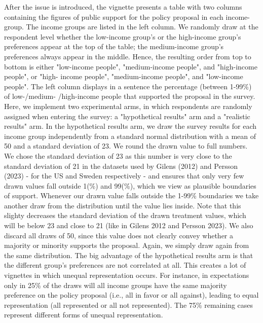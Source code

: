 \documentclass[12pt, letterpaper]{article}
\begin{document}
\begin{spacing}{1.5}
After the issue is introduced, the vignette presents a table with two columns containing the figures of public support for the policy 
proposal in each income- group. The income groups are listed in the left column. We randomly draw at the respondent level whether the low-income group's or the high-income group's preferences appear at the top of the table; the medium-income group's preferences always appear in the middle. Hence, the resulting order from top to bottom is either "low-income people", "medium-income people", and "high-income people", or "high- income people", "medium-income people", and "low-income people". The left column displays in a sentence the percentage (between 1-99\%) of low-/medium- /high-income people that supported the proposal in the survey.
Here, we implement two experimental arms, in which respondents are randomly assigned when entering the survey: a "hypothetical results" arm and a "realistic results" arm. In the hypothetical results arm, we draw the survey results for each income group independently from a standard normal distribution with a mean of 50 and a standard deviation of 23. We round the drawn value to full numbers. We chose the standard deviation of 23 as this number is very close to the standard deviation of 21 in the datasets used by Gilens (2012) and Persson (2023) - for the US and Sweden respectively - and ensures that only very few drawn values fall outside 1(\%) and 99(\%), which we view as plausible boundaries of support. Whenever our drawn value falls outside the 1-99\% boundaries we take another draw from the distribution until the value lies inside. Note that this slighty decreases the standard deviation of the drawn treatment values, which will be below 23 and close to 21 (like in Gilens 2012 and Persson 2023). We also discard all draws of 50, since this value does not clearly convey whether a majority or minority supports the proposal. Again, we simply draw again from the same distribution. The big advantage of the hypothetical results arm is that the different group's preferences are not correlated at all. This creates a lot of vignettes in which unequal representation occurs. For instance, in expectations only in 25\% of the draws will all income groups have the same majority preference on the policy proposal (i.e., all in favor or all against), leading to equal representation (all represented or all not represented). The 75\% remaining cases represent different forms of unequal representation.


\end{spacing}
\end{document}
